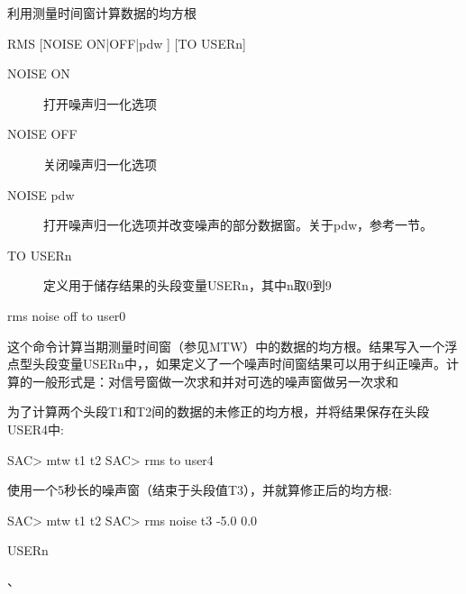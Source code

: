 \label{cmd:rms}

利用测量时间窗计算数据的均方根

\begin{SACSTX}
RMS [NOISE ON|OFF|pdw ] [TO USERn]
\end{SACSTX}

\begin{description}
\item [NOISE ON] 打开噪声归一化选项  
\item [NOISE OFF] 关闭噪声归一化选项  
\item [NOISE pdw] 打开噪声归一化选项并改变噪声的部分数据窗。关于pdw，参考一节。
\item [TO USERn] 定义用于储存结果的头段变量USERn，其中n取0到9 
\end{description}

\begin{SACDFT}
rms noise off to user0
\end{SACDFT}

这个命令计算当期测量时间窗（参见MTW）中的数据的均方根。结果写入一个浮点型头段变量USERn中，，如果定义了一个噪声时间窗结果可以用于纠正噪声。计算的一般形式是：对信号窗做一次求和并对可选的噪声窗做另一次求和

为了计算两个头段T1和T2间的数据的未修正的均方根，并将结果保存在头段USER4中:
\begin{SACCode}
SAC> mtw t1 t2
SAC> rms to user4
\end{SACCode}

使用一个5秒长的噪声窗（结束于头段值T3），并就算修正后的均方根:
\begin{SACCode}
SAC> mtw t1 t2
SAC> rms noise t3 -5.0 0.0
\end{SACCode}

USERn

、
